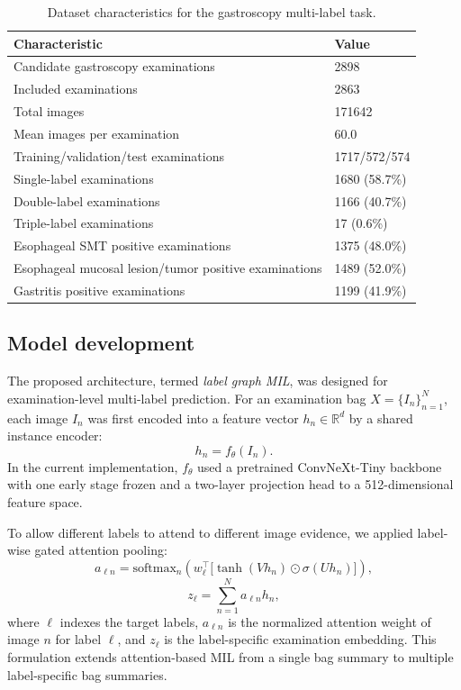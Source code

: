 \documentclass[Afour,sagev,times]{sagej}
\begin{document}
\begin{table}[h]
\small\sf\centering
\caption{Dataset characteristics for the gastroscopy multi-label task.\label{T1}}
\begin{tabular}{p{}p{}}
\toprule
Characteristic & Value \\
\midrule
Candidate gastroscopy examinations & 2898 \\
Included examinations & 2863 \\
Total images & 171642 \\
Mean images per examination & 60.0 \\
Training/validation/test examinations & 1717/572/574 \\
Single-label examinations & 1680 (58.7\%) \\
Double-label examinations & 1166 (40.7\%) \\
Triple-label examinations & 17 (0.6\%) \\
Esophageal SMT positive examinations & 1375 (48.0\%) \\
Esophageal mucosal lesion/tumor positive examinations & 1489 (52.0\%) \\
Gastritis positive examinations & 1199 (41.9\%) \\
\bottomrule
\end{tabular}
\end{table}

\subsection{Model development}
The proposed architecture, termed \textit{label graph MIL}, was designed for examination-level multi-label prediction. For an examination bag $X=\{I_n\}_{n=1}^{N}$, each image $I_n$ was first encoded into a feature vector $h_n \in \mathbb{R}^{d}$ by a shared instance encoder:
\begin{equation}
h_n = f_{\theta}(I_n).
\end{equation}
In the current implementation, $f_{\theta}$ used a pretrained ConvNeXt-Tiny backbone with one early stage frozen and a two-layer projection head to a 512-dimensional feature space.\cite{R10}

To allow different labels to attend to different image evidence, we applied label-wise gated attention pooling:
\begin{equation}
a_{\ell n} = \mathrm{softmax}_n\left(w_{\ell}^{\top}\bigl[\tanh(Vh_n)\odot\sigma(Uh_n)\bigr]\right),
\end{equation}
\begin{equation}
z_{\ell}=\sum_{n=1}^{N} a_{\ell n}h_n,
\end{equation}
where $\ell$ indexes the target labels, $a_{\ell n}$ is the normalized attention weight of image $n$ for label $\ell$, and $z_{\ell}$ is the label-specific examination embedding. This formulation extends attention-based MIL from a single bag summary to multiple label-specific bag summaries.\cite{R4}
\end{document}
